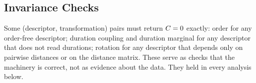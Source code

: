 \subsection{Invariance Checks}
Some (descriptor, transformation) pairs must return $C = 0$ exactly: order for any order-free descriptor; duration coupling and duration marginal for any descriptor that does not read durations; rotation for any descriptor that depends only on pairwise distances or on the distance matrix. These serve as checks that the machinery is correct, not as evidence about the data. They held in every analysis below.

